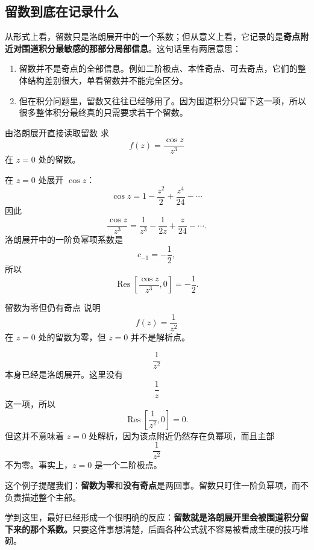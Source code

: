\subsection{留数到底在记录什么}

从形式上看，留数只是洛朗展开中的一个系数；但从意义上看，它记录的是\textbf{奇点附近对围道积分最敏感的那部分局部信息}。这句话里有两层意思：

\begin{enumerate}
    \item 留数并不是奇点的全部信息。例如二阶极点、本性奇点、可去奇点，它们的整体结构差别很大，单看留数并不能完全区分。
    \item 但在积分问题里，留数又往往已经够用了。因为围道积分只留下这一项，所以很多整体积分最终真的只需要求若干个留数。
\end{enumerate}

\begin{lizi}{由洛朗展开直接读取留数}{}
求
\[
    f(z)=\frac{\cos z}{z^3}
\]
在 $z=0$ 处的留数。

\begin{jie}
在 $z=0$ 处展开 $\cos z$：
\[
    \cos z = 1-\frac{z^2}{2}+\frac{z^4}{24}-\cdots
\]
因此
\[
    \frac{\cos z}{z^3}
    =
    \frac{1}{z^3}-\frac{1}{2z}+\frac{z}{24}-\cdots.
\]
洛朗展开中的一阶负幂项系数是
\[
    c_{-1}=-\frac{1}{2},
\]
所以
\[
    \operatorname{Res}\left[\frac{\cos z}{z^3},0\right]
    =
    -\frac{1}{2}.
\]
\end{jie}
\end{lizi}

\begin{lizi}{留数为零但仍有奇点}{}
说明
\[
    f(z)=\frac{1}{z^2}
\]
在 $z=0$ 处的留数为零，但 $z=0$ 并不是解析点。

\begin{jie}
\[
    \frac{1}{z^2}
\]
本身已经是洛朗展开。这里没有
\[
    \frac{1}{z}
\]
这一项，所以
\[
    \operatorname{Res}\left[\frac{1}{z^2},0\right]=0.
\]
但这并不意味着 $z=0$ 处解析，因为该点附近仍然存在负幂项，而且主部
\[
    \frac{1}{z^2}
\]
不为零。事实上，$z=0$ 是一个二阶极点。

这个例子提醒我们：\textbf{留数为零}和\textbf{没有奇点}是两回事。留数只盯住一阶负幂项，而不负责描述整个主部。
\end{jie}
\end{lizi}

\begin{tishi}[这一节最想留下的印象]
学到这里，最好已经形成一个很明确的反应：\textbf{留数就是洛朗展开里会被围道积分留下来的那个系数。}只要这件事想清楚，后面各种公式就不容易被看成生硬的技巧堆砌。
\end{tishi}

